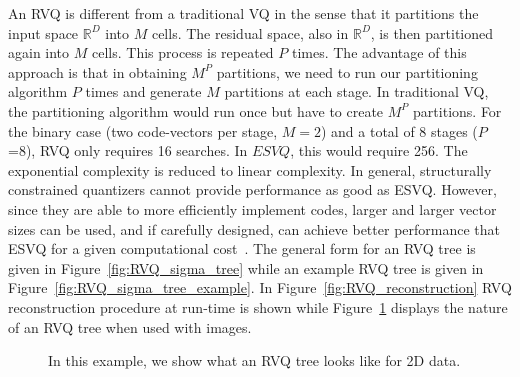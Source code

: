 \documentclass{article}
\begin{document}
An RVQ is different from a traditional VQ in the sense that it partitions the input space $\mathbb{R}^D$ into $M$ cells.  The residual space, also in $\mathbb{R}^D$, is then partitioned again into $M$ cells.  This process is repeated $P$ times.  The advantage of this approach is that in obtaining $M^P$ partitions, we need to run our partitioning algorithm $P$ times and generate $M$ partitions at each stage.  In traditional VQ, the partitioning algorithm would run once but have to create $M^P$ partitions.  For the binary case (two code-vectors per stage, $M=2$) and a total of 8 stages ($P$=8), RVQ only requires 16 searches.  In $ESVQ$, this would require 256.  The exponential complexity is reduced to linear complexity.  In general, structurally constrained quantizers cannot provide performance as good as ESVQ.  However, since they are able to more efficiently implement codes, larger and larger vector sizes can be used, and if carefully designed, can achieve better performance that ESVQ for a given computational cost~\cite{1996_JNL_AdvancesRVQ_Barnes}.  The general form for an RVQ tree is given in Figure~\ref{fig:RVQ_sigma_tree} while an example RVQ tree is given in Figure~\ref{fig:RVQ_sigma_tree_example}.  In Figure~\ref{fig:RVQ_reconstruction} RVQ reconstruction procedure at run-time is shown while Figure~\ref{fig:RVQ_2Dtree} displays the nature of an RVQ tree when used with images.






\begin{figure}[t]
\centering{}
\caption{In this example, we show what an RVQ tree looks like for 2D data.}
\label{fig:RVQ_2Dtree}
\end{figure}
\end{document}

